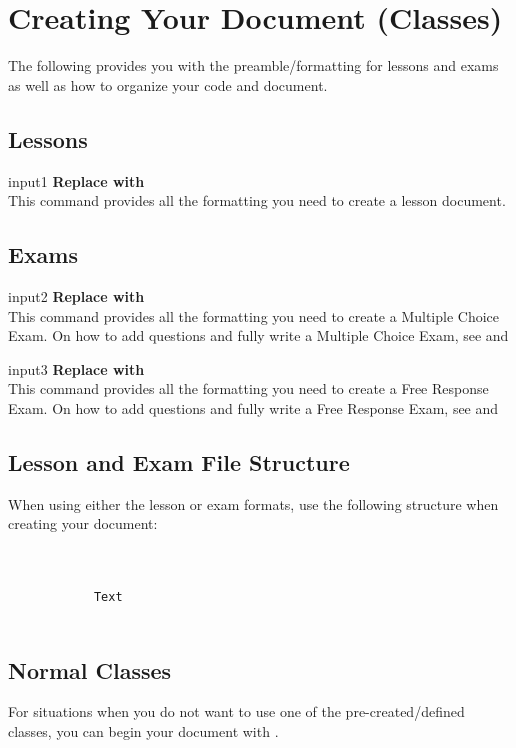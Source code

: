 \section{Creating Your Document (Classes)}
\vspace{10.5cm}
The following provides you with the preamble/formatting for lessons and exams as well as how to organize your code and document.
	\subsection{Lessons} 
		\begin{docCommand}{input1}{}
		        \textbf{Replace  with }\\
				This command provides all the formatting you need to create a lesson document.   
		\end{docCommand}
	\subsection{Exams}
		\begin{docCommand}{input2}{}
		        \textbf{Replace  with }\\
				This command provides all the formatting you need to create a Multiple Choice Exam. On how to add questions and fully write a Multiple Choice Exam, see  and 
		\end{docCommand}
		\begin{docCommand}{input3}{}
		        \textbf{Replace  with }\\
				This command provides all the formatting you need to create a Free Response Exam. On how to add questions and fully write a Free Response Exam, see  and 
		\end{docCommand}
	\subsection{Lesson and Exam File Structure}
			When using either the lesson or exam formats, use the following structure when creating your document:
			\begin{verbatim}
			
			
			Text
			
			\end{verbatim} 
	\subsection{Normal Classes}
			For situations when you do not want to use one of the pre-created/defined classes, you can begin your document with .
